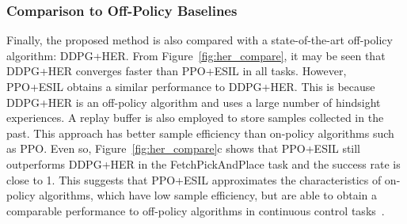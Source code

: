 \subsubsection{Comparison to Off-Policy Baselines}
Finally, {the proposed method is also compared} with a state-of-the-art off-policy algorithm: DDPG+HER. From {Figure~\ref{fig:her_compare}, it may be seen that} DDPG+HER converges faster than PPO+ESIL in all tasks. {However, PPO+ESIL obtains a similar performance to DDPG+HER. This is because DDPG+HER is an off-policy algorithm and uses a large number of hindsight experiences. A replay buffer is also employed to store  samples collected in the past. This approach has better sample efficiency than on-policy algorithms such as PPO.} Even so, {Figure~\ref{fig:her_compare}c} shows that PPO+ESIL still outperforms DDPG+HER in the FetchPickAndPlace task and the success rate is close to 1. {This suggests that PPO+ESIL approximates the characteristics of on-policy algorithms, which have low sample efficiency, but are able to obtain a comparable performance to off-policy algorithms in continuous control tasks~\cite{schulman2017proximal}.}
